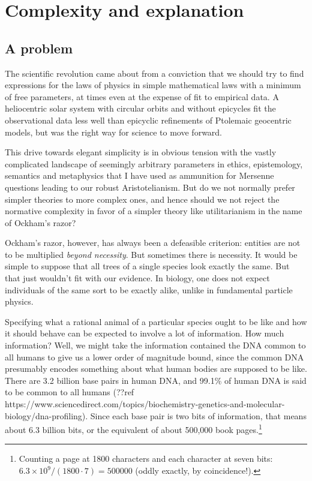 \section{Complexity and explanation}\label{sec:hierarchy}
\subsection{A problem}
The scientific revolution came about from a conviction that we should try to find expressions for the laws
of physics in simple mathematical laws with a minimum of free parameters, at times even at the expense of fit 
to empirical data. A heliocentric solar system with circular orbits and without epicycles fit the observational 
data less well than epicyclic refinements of Ptolemaic geocentric models, but was the right way for science to 
move forward. 

This drive towards elegant simplicity is in obvious tension with the vastly complicated landscape of seemingly
arbitrary parameters in ethics, epistemology, semantics and metaphysics that I have used as ammunition for
Mersenne questions leading to our robust Aristotelianism. 
But do we not normally prefer simpler theories to more complex ones, and hence should we not reject the normative
complexity in favor of a simpler theory like utilitarianism in the name of Ockham's razor?

Ockham's razor, however, has always been a defeasible criterion: entities are not to be multiplied \textit{beyond necessity}.
But sometimes there is necessity. It would be simple to suppose that all trees of a single species look exactly the same.
But that just wouldn't fit with our evidence. In biology, one does not expect individuals of the same sort to be exactly
alike, unlike in fundamental particle physics.

Specifying what a rational animal of a particular species ought to be like
and how it should behave can be expected to involve a lot of information. How much information? Well, we might take the information contained
the DNA common to all humans to give us a lower order of magnitude bound, since the common DNA presumably encodes something
about what human bodies are supposed to be like. There are 3.2 billion base pairs in human DNA, and 
99.1\% of human DNA is said to be common to all humans (??ref https://www.sciencedirect.com/topics/biochemistry-genetics-and-molecular-biology/dna-profiling).
Since each base pair is two bits of information, that means about 6.3 billion bits, or the equivalent of about 500,000
book pages.\footnote{Counting a page at 1800 characters and each character at seven bits: $6.3\times 10^9/(1800\cdot 7)=500000$
(oddly exactly, by coincidence!).} 

